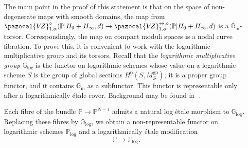 \documentclass[11pt]{amsart}
\newcommand{\VZ}{\pazocal{V\!Z}}
\renewcommand{\to}{\rightarrow}
\newcommand{\Gm}{\mathbb{G}_{\text{m}}}
\theoremstyle{definition}
\theoremstyle{definition}
\begin{document}
The main point in the proof of this statement is that on the space of non-degenerate maps with smooth domains, the map from $\VZ^\circ_{1,\alpha}(\mathbb P|H_0+H_\infty,d)\to \VZ^{\leftrightarrow,\circ}_{1,\alpha}(\mathbb P|H_0+H_\infty,d)$ is a $\mathbb G_{\operatorname{m}}$-torsor. Correspondingly, the map on compact moduli spaces is a nodal curve fibration. To prove this, it is convenient to work with the logarithmic multiplicative group and its torsors. Recall that the \textit{logarithmic multiplicative group} $\mathbb G_{\mathrm{log}}$ is the functor on logarithmic schemes whose value on a logarithmic scheme $S$ is the group of global sections $H^0(S,M_S^{\mathrm{gp}})$; it is a proper group functor, and it contains $\Gm$ as a subfunctor. This functor is representable only after a logarithmically \'etale cover. Background may be found in~\cite{MW17,RW19}.

Each fibre of the bundle $\mathbb P \to \mathbb P^{N-1}$ admits a natural log \'etale morphism to $\mathbb G_{\mathrm{log}}$. Replacing these fibres by $\mathbb G_{\mathrm{log}}$, we obtain a non-representable functor on logarithmic schemes $\mathbb P_{\mathrm{log}}$ and a logarithmically \'etale modification
\[
\mathbb P\to \mathbb P_{\mathrm{log}}.
\]

\end{document}
